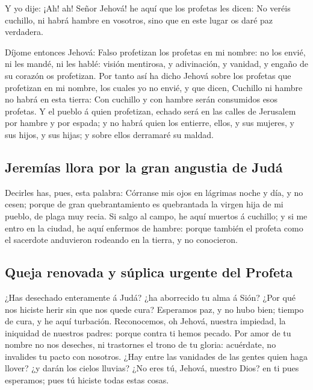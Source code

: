  Y yo dije: ¡Ah! ah! Señor Jehová! he aquí que los profetas
les dicen: No veréis cuchillo, ni habrá hambre en vosotros, sino que en
este lugar os daré paz verdadera.

 Díjome entonces Jehová: Falso profetizan los profetas en
mi nombre: no los envié, ni les mandé, ni les hablé: visión mentirosa, y
adivinación, y vanidad, y engaño de su corazón os profetizan.
 Por tanto así ha dicho Jehová sobre los profetas que
profetizan en mi nombre, los cuales yo no envié, y que dicen, Cuchillo
ni hambre no habrá en esta tierra: Con cuchillo y con hambre serán
consumidos esos profetas.  Y el pueblo á quien profetizan,
echado será en las calles de Jerusalem por hambre y por espada; y no
habrá quien los entierre, ellos, y sus mujeres, y sus hijos, y sus
hijas; y sobre ellos derramaré su maldad.

\hypertarget{jeremuxedas-llora-por-la-gran-angustia-de-juduxe1}{%
\subsection{Jeremías llora por la gran angustia de
Judá}\label{jeremuxedas-llora-por-la-gran-angustia-de-juduxe1}}

 Decirles has, pues, esta palabra: Córranse mis ojos en
lágrimas noche y día, y no cesen; porque de gran quebrantamiento es
quebrantada la virgen hija de mi pueblo, de plaga muy recia.
 Si salgo al campo, he aquí muertos á cuchillo; y si me
entro en la ciudad, he aquí enfermos de hambre: porque también el
profeta como el sacerdote anduvieron rodeando en la tierra, y no
conocieron.

\hypertarget{queja-renovada-y-suxfaplica-urgente-del-profeta}{%
\subsection{Queja renovada y súplica urgente del
Profeta}\label{queja-renovada-y-suxfaplica-urgente-del-profeta}}

 ¿Has desechado enteramente á Judá? ¿ha aborrecido tu alma
á Sión? ¿Por qué nos hiciste herir sin que nos quede cura? Esperamos
paz, y no hubo bien; tiempo de cura, y he aquí turbación. 
Reconocemos, oh Jehová, nuestra impiedad, la iniquidad de nuestros
padres: porque contra ti hemos pecado.  Por amor de tu
nombre no nos deseches, ni trastornes el trono de tu gloria: acuérdate,
no invalides tu pacto con nosotros.  ¿Hay entre las
vanidades de las gentes quien haga llover? ¿y darán los cielos lluvias?
¿No eres tú, Jehová, nuestro Dios? en ti pues esperamos; pues tú hiciste
todas estas cosas.

